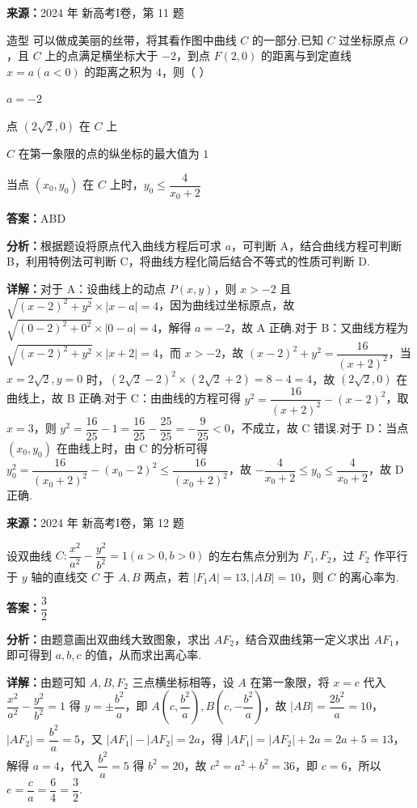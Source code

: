 \begin{question}[points=6]
\textbf{来源：}2024 年 新高考I卷，第 11 题\par
造型 可以做成美丽的丝带，将其看作图中曲线 $C$ 的一部分.已知 $C$ 过坐标原点 $O$，且 $C$ 上的点满足横坐标大于 $-2$，到点 $F(2,0)$ 的距离与到定直线 $x=a(a<0)$ 的距离之积为 $4$，则（ ）
\begin{choices}
  \item $a=-2$
  \item 点 $(2\sqrt{2},0)$ 在 $C$ 上
  \item $C$ 在第一象限的点的纵坐标的最大值为 $1$
  \item 当点 $(x_0,y_0)$ 在 $C$ 上时，$y_0\le \dfrac{4}{x_0+2}$
\end{choices}
\begin{solution}
\textbf{答案：}ABD

\textbf{分析：}根据题设将原点代入曲线方程后可求 $a$，可判断 A，结合曲线方程可判断 B，利用特例法可判断 C，将曲线方程化简后结合不等式的性质可判断 D.

\textbf{详解：}对于 A：设曲线上的动点 $P(x,y)$，则 $x>-2$ 且 $\sqrt{(x-2)^2+y^2}\times|x-a|=4$，因为曲线过坐标原点，故 $\sqrt{(0-2)^2+0^2}\times|0-a|=4$，解得 $a=-2$，故 A 正确.对于 B：又曲线方程为 $\sqrt{(x-2)^2+y^2}\times|x+2|=4$，而 $x>-2$，故 $(x-2)^2+y^2=\dfrac{16}{(x+2)^2}$，当 $x=2\sqrt{2},y=0$ 时，$(2\sqrt{2}-2)^2\times(2\sqrt{2}+2)=8-4=4$，故 $(2\sqrt{2},0)$ 在曲线上，故 B 正确.对于 C：由曲线的方程可得 $y^2=\dfrac{16}{(x+2)^2}-(x-2)^2$，取 $x=3$，则 $y^2=\dfrac{16}{25}-1=\dfrac{16}{25}-\dfrac{25}{25}=-\dfrac{9}{25}<0$，不成立，故 C 错误.对于 D：当点 $(x_0,y_0)$ 在曲线上时，由 C 的分析可得 $y_0^2=\dfrac{16}{(x_0+2)^2}-(x_0-2)^2\le \dfrac{16}{(x_0+2)^2}$，故 $-\dfrac{4}{x_0+2}\le y_0\le \dfrac{4}{x_0+2}$，故 D 正确.
\end{solution}
\end{question}

\begin{question}[points=5]
\textbf{来源：}2024 年 新高考I卷，第 12 题\par
设双曲线 $C:\dfrac{x^2}{a^2}-\dfrac{y^2}{b^2}=1(a>0,b>0)$ 的左右焦点分别为 $F_1,F_2$，过 $F_2$ 作平行于 $y$ 轴的直线交 $C$ 于 $A,B$ 两点，若 $|F_1A|=13,|AB|=10$，则 $C$ 的离心率为.
\fillin[{$\dfrac{3}{2}$}]
\begin{solution}
\textbf{答案：}$\dfrac{3}{2}$

\textbf{分析：}由题意画出双曲线大致图象，求出 $AF_2$，结合双曲线第一定义求出 $AF_1$，即可得到 $a,b,c$ 的值，从而求出离心率.

\textbf{详解：}由题可知 $A,B,F_2$ 三点横坐标相等，设 $A$ 在第一象限，将 $x=c$ 代入 $\dfrac{x^2}{a^2}-\dfrac{y^2}{b^2}=1$ 得 $y=\pm\dfrac{b^2}{a}$，即 $A\left(c,\dfrac{b^2}{a}\right),B\left(c,-\dfrac{b^2}{a}\right)$，故 $|AB|=\dfrac{2b^2}{a}=10$，$|AF_2|=\dfrac{b^2}{a}=5$，又 $|AF_1|-|AF_2|=2a$，得 $|AF_1|=|AF_2|+2a=2a+5=13$，解得 $a=4$，代入 $\dfrac{b^2}{a}=5$ 得 $b^2=20$，故 $c^2=a^2+b^2=36$，即 $c=6$，所以 $e=\dfrac{c}{a}=\dfrac{6}{4}=\dfrac{3}{2}$.
\end{solution}
\end{question}

